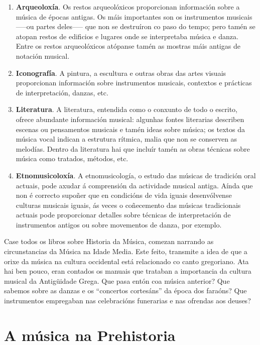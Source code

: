 \documentclass[a4paper, twoside]{templates/ociamthesis}
\providecommand{\tightlist}{%
  \setlength{\itemsep}{0pt}\setlength{\parskip}{0pt}}
\begin{document}
\begin{enumerate}
\def\labelenumi{\arabic{enumi}.}
\tightlist
\item
  \textbf{Arqueoloxía}. Os restos arqueolóxicos proporcionan información sobre a música de épocas antigas. Os máis importantes son os instrumentos musicais -----ou partes deles----- que non se destruíron co paso do tempo; pero tamén se atopan restos de edificios e lugares onde se interpretaba música e danza. Entre os restos arqueolóxicos atópanse tamén as mostras máis antigas de notación musical.
\item
  \textbf{Iconografía}. A pintura, a escultura e outras obras das artes visuais proporcionan información sobre instrumentos musicais, contextos e prácticas de interpretación, danzas, etc.
\item
  \textbf{Literatura}. A literatura, entendida como o conxunto de todo o escrito, ofrece abundante información musical: algunhas fontes literarias describen escenas ou pensamentos musicais e tamén ideas sobre música; os textos da música vocal indican a estrutura rítmica, malia que non se conserven as melodías. Dentro da literatura hai que incluír tamén as obras técnicas sobre música como tratados, métodos, etc.
\item
  \textbf{Etnomusicoloxía}. A etnomusicología, o estudo das músicas de tradición oral actuais, pode axudar á comprensión da actividade musical antiga. Aínda que non é correcto supoñer que en condicións de vida iguais desenvólvense culturas musicais iguais, ás veces o coñecemento das músicas tradicionais actuais pode proporcionar detalles sobre técnicas de interpretación de instrumentos antigos ou sobre movementos de danza, por exemplo.
\end{enumerate}

Case todos os libros sobre Historia da Música, comezan narrando as circunstancias da Música na Idade Media. Este feito, transmite a idea de que a orixe da música na cultura occidental está relacionado co canto gregoriano. Ata hai ben pouco, eran contados os manuais que trataban a importancia da cultura musical da Antigüidade Grega. Que pasa entón coa música anterior? Que sabemos sobre as danzas e os ``concertos cortesáns'' da época dos faraóns? Que instrumentos empregaban nas celebracións funerarias e nas ofrendas aos deuses?

\hypertarget{a-muxfasica-na-prehistoria}{%
\section{A música na Prehistoria}\label{a-muxfasica-na-prehistoria}}
\end{document}
